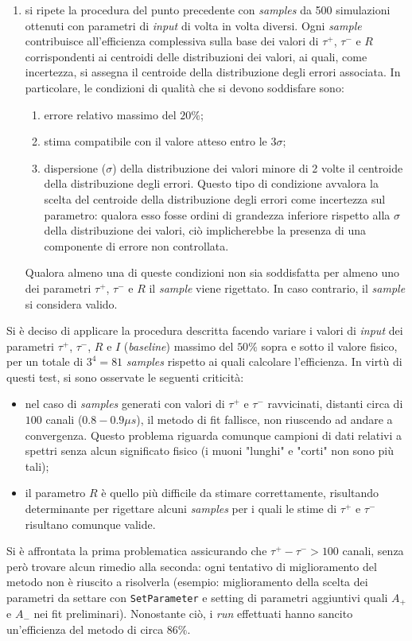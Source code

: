 \documentclass[10pt, oneside, a4paper]{article}   	%
\begin{document}
\begin{enumerate}
 \item si ripete la procedura del punto precedente con \textit{samples} da 500 simulazioni ottenuti con parametri di \textit{input} di volta in volta diversi. Ogni \textit{sample} contribuisce all'efficienza complessiva sulla base dei valori di $\tau^+$, $\tau^-$ e $R$ corrispondenti ai centroidi delle distribuzioni dei valori, ai quali, come incertezza, si assegna il centroide della distribuzione degli errori associata. In particolare, le condizioni di qualità che si devono soddisfare sono:  
 \begin{enumerate}
  \item errore relativo massimo del $20\%$;
  \item stima compatibile con il valore atteso entro le $3\sigma$;
  \item dispersione ($\sigma$) della distribuzione dei valori minore di 2 volte il centroide della distribuzione degli errori. Questo tipo di condizione avvalora la scelta del centroide della distribuzione degli errori come incertezza sul parametro: qualora esso fosse ordini di grandezza inferiore rispetto alla $\sigma$ della distribuzione dei valori, ciò implicherebbe la presenza di una componente di errore non controllata.  
 \end{enumerate}
Qualora almeno una di queste condizioni non sia soddisfatta per almeno uno dei parametri $\tau^+$, $\tau^-$ e $R$ il \textit{sample} viene rigettato. In caso contrario, il \textit{sample} si considera valido. 
\end{enumerate}
Si è deciso di applicare la procedura descritta facendo variare i valori di \textit{input} dei parametri $\tau^+$, $\tau^-$, $R$ e $I$ (\textit{baseline}) massimo del $50\%$ sopra e sotto il valore fisico, per un totale di $3^4=81$ \textit{samples} rispetto ai quali calcolare l'efficienza. In virtù di questi test, si sono osservate le seguenti criticità:
\begin{itemize}
 \item nel caso di \textit{samples} generati con valori di $\tau^+$ e $\tau^-$ ravvicinati, distanti circa di $100$ canali ($0.8 - 0.9 \mu s$), il metodo di fit fallisce, non riuscendo ad andare a convergenza. Questo problema riguarda comunque campioni di dati relativi a spettri senza alcun significato fisico (i muoni "lunghi" e "corti" non sono più tali);
 \item il parametro $R$ è quello più difficile da stimare correttamente, risultando determinante per rigettare alcuni \textit{samples} per i quali le stime di $\tau^+$ e $\tau^-$ risultano comunque valide.  
\end{itemize}
Si è affrontata la prima problematica assicurando che $\tau^+-\tau^->100$ canali, senza però trovare alcun rimedio alla seconda: ogni tentativo di miglioramento del metodo non è riuscito a risolverla (esempio: miglioramento della scelta dei parametri da settare con \lstinline{SetParameter} e setting di parametri aggiuntivi quali $A_+$ e $A_-$ nei fit preliminari).
Nonostante ciò, i \textit{run} effettuati hanno sancito un'efficienza del metodo di circa $86\%$. 
%
\end{document}
